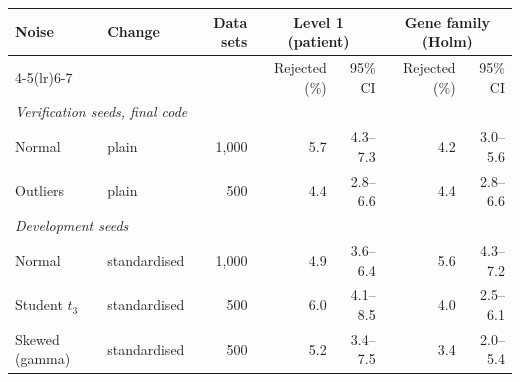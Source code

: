 \begin{tabular}{llrrrrr}
\toprule
Noise & Change & Data sets & \multicolumn{2}{c}{Level 1 (patient)} & \multicolumn{2}{c}{Gene family (Holm)} \\
\cmidrule(lr){4-5}\cmidrule(lr){6-7}
 & & & Rejected (\%) & 95\% CI & Rejected (\%) & 95\% CI \\
\midrule
\multicolumn{7}{l}{\emph{Verification seeds, final code}} \\
Normal & plain & 1,000 & 5.7 & 4.3--7.3 & 4.2 & 3.0--5.6 \\
Outliers & plain & 500 & 4.4 & 2.8--6.6 & 4.4 & 2.8--6.6 \\
\multicolumn{7}{l}{\emph{Development seeds}} \\
Normal & standardised & 1,000 & 4.9 & 3.6--6.4 & 5.6 & 4.3--7.2 \\
Student $t_3$ & standardised & 500 & 6.0 & 4.1--8.5 & 4.0 & 2.5--6.1 \\
Skewed (gamma) & standardised & 500 & 5.2 & 3.4--7.5 & 3.4 & 2.0--5.4 \\
\bottomrule
\end{tabular}
